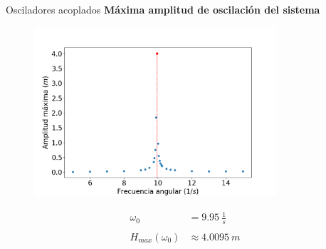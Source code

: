 \begin{frame}{Osciladores acoplados}
    \textbf{Máxima amplitud de oscilación del sistema}
    \begin{minipage}[c]{0.7\linewidth}
        \begin{figure}[H]
            \centering
            \includegraphics[width=0.8\textwidth]{pic/05-results/system_max_amplitude}
            \label{fig:system-max-amplitude}
        \end{figure}
    \end{minipage}
    \begin{minipage}[c]{0.25\linewidth}
        \large{
            \begin{equation*}
                \begin{aligned}
                    \omega_0 &= 9.95\ \frac{1}{s} \\ \\
                    H_{max}(\omega_0) &\approx 4.0095\ m
                \end{aligned}
            \end{equation*}
        }
    \end{minipage}
\end{frame}



